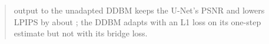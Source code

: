 \documentclass[11pt]{article}
\begin{document}
\begin{abstract}
output to the unadapted DDBM keeps the U-Net's PSNR and lowers LPIPS by about \FSDULSIX; the DDBM adapts with an L1 loss on its one-step estimate but not with its bridge loss.
\end{abstract}









\end{document}
